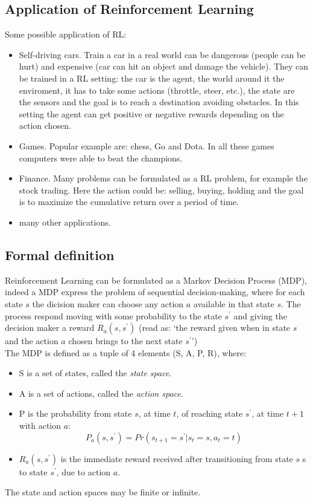 \documentclass[14pt]{extarticle}
\def\sp{\vspace{5pt}}
\begin{document}
\begin{flushleft}
\subsection{Application of Reinforcement Learning}
Some possible application of RL:
\begin{itemize}
\item Self-driving cars. Train a car in a real world can be dangerous (people can be hurt) and expensive (car can hit an object and damage the vehicle). They can be trained in a RL setting: the car is the agent, the world around it the enviroment, it has to take some actions (throttle, steer, etc.), the state are the sensors and the goal is to reach a destination avoiding obstacles. In this setting the agent can get positive or negative rewards depending on the action chosen.
\item Games. Popular example are: chess, Go and Dota. In all these games computers were able to beat the champions.
\item Finance. Many problems can be formulated as a RL problem, for example the stock trading. Here the action could be: selling, buying, holding and the goal is to maximize the  cumulative return over a period of time.
\item many other applications\cite{RLapplications}.
\end{itemize}

\subsection{Formal definition}
\sp
Reinforcement Learning can be formulated as a Markov Decision Process (MDP), indeed a MDP express the problem of sequential decision-making, where for each state $s$ the dicision maker can choose any action $a$ available in that state $s$. The process respond moving with some probability to the state $s^\prime$ and giving the decision maker a reward $R_a(s,s^\prime)$ (read as: `the reward given when in state $s$ and the action $a$ chosen brings to the next state $s^\prime$')
\\
The MDP is defined as a tuple of 4 elements (S, A, P, R), where:
\begin{itemize}
\item S is a set of states, called the \emph{state space}.
\item A is a set of actions, called the \emph{action space}.
\item P is the probability from state $s$, at time $t$, of reaching state $s^\prime$, at time $t+1$ with action $a$:
\[P_a(s,s^\prime) = Pr(s_{t+1} = s^\prime | s_t = s, a_t = t)\]
\item $R_a(s,s^\prime)$ is the immediate reward received after transitioning from state $s$ s to state $s^\prime$, due to action $a$.
\end{itemize}
The state and action spaces may be finite or infinite.


\end{flushleft}
\end{document}
